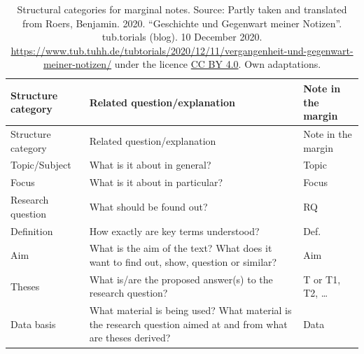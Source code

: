 \documentclass[
  english,
]{scrreprt}
\begin{document}
\begin{longtable}[]{@{}
  >{\raggedright\arraybackslash}p{}
  >{\raggedright\arraybackslash}p{}
  >{\raggedright\arraybackslash}p{}@{}}
\caption{Structural categories for marginal notes. Source: Partly taken and translated from Roers, Benjamin. 2020. “Geschichte und Gegenwart meiner Notizen”. tub.torials (blog). 10 December 2020. \url{https://www.tub.tuhh.de/tubtorials/2020/12/11/vergangenheit-und-gegenwart-meiner-notizen/} under the licence \href{https://creativecommons.org/licenses/by/4.0/}{CC BY 4.0}. Own adaptations.}\tabularnewline
\toprule\noalign{}
\begin{minipage}[b]{\linewidth}\raggedright
Structure category
\end{minipage} & \begin{minipage}[b]{\linewidth}\raggedright
Related question/explanation
\end{minipage} & \begin{minipage}[b]{\linewidth}\raggedright
Note in the margin
\end{minipage} \\
\midrule\noalign{}
\endfirsthead
\toprule\noalign{}
\begin{minipage}[b]{\linewidth}\raggedright
Structure category
\end{minipage} & \begin{minipage}[b]{\linewidth}\raggedright
Related question/explanation
\end{minipage} & \begin{minipage}[b]{\linewidth}\raggedright
Note in the margin
\end{minipage} \\
\midrule\noalign{}
\endhead
\bottomrule\noalign{}
\endlastfoot
Topic/Subject & What is it about in general? & Topic \\
Focus & What is it about in particular? & Focus \\
Research question & What should be found out? & RQ \\
Definition & How exactly are key terms understood? & Def. \\
Aim & What is the aim of the text? What does it want to find out, show, question or similar? & Aim \\
Theses & What is/are the proposed answer(s) to the research question? & T or T1, T2, … \\
Data basis & What material is being used? What material is the research question aimed at and from what are theses derived? & Data \\

\end{longtable}
\end{document}

